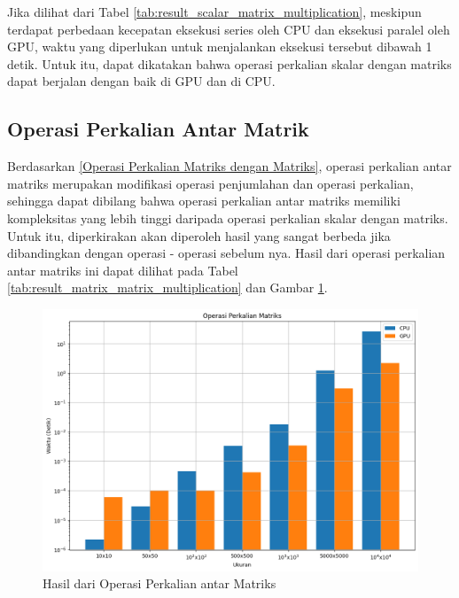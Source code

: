 Jika dilihat dari Tabel \ref{tab:result_scalar_matrix_multiplication}, meskipun terdapat perbedaan kecepatan eksekusi series oleh CPU dan eksekusi paralel oleh GPU, waktu yang diperlukan untuk menjalankan eksekusi tersebut dibawah 1 detik. Untuk itu, dapat dikatakan bahwa operasi perkalian skalar dengan matriks dapat berjalan dengan baik di GPU dan di CPU.

\subsection{Operasi Perkalian Antar Matrik}

Berdasarkan \ref{Operasi Perkalian Matriks dengan Matriks}, operasi perkalian antar matriks merupakan modifikasi operasi penjumlahan dan operasi perkalian, sehingga dapat dibilang bahwa operasi perkalian antar matriks memiliki kompleksitas yang lebih tinggi daripada operasi perkalian skalar dengan matriks. Untuk itu, diperkirakan akan diperoleh hasil yang sangat berbeda jika dibandingkan dengan operasi - operasi sebelum nya. Hasil dari operasi perkalian antar matriks ini dapat dilihat pada Tabel \ref{tab:result_matrix_matrix_multiplication} dan Gambar \ref{img:result_matrix_matrix_multiplication}.

\begin{figure}[H]
	\centering
	\includegraphics[width=14cm, scale=1]{images/penelitian/matrix-matrix-multiplication.png}
	\caption{Hasil dari Operasi Perkalian antar Matriks}
	\label{img:result_matrix_matrix_multiplication}
\end{figure}

